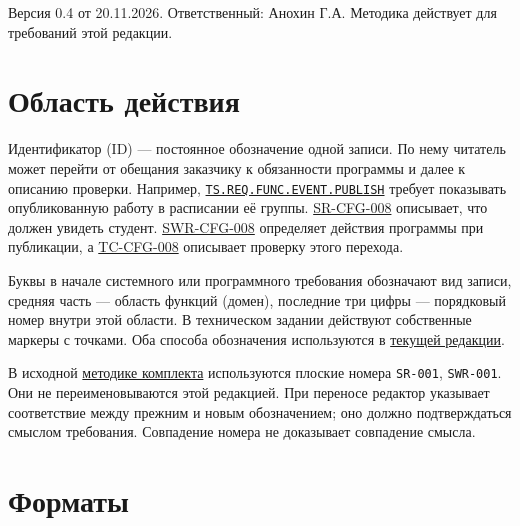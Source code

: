 \documentclass[12pt,a4paper]{article}
\begin{document}
Версия 0.4 от 20.11.2026. Ответственный: Анохин Г.А. Методика действует для требований этой редакции.

\section{Область действия}\label{ux43eux431ux43bux430ux441ux442ux44c-ux434ux435ux439ux441ux442ux432ux438ux44f}

\hypertarget{область-действия}{}

Идентификатор (ID) --- постоянное обозначение одной записи. По нему читатель может перейти от обещания заказчику к обязанности программы и далее к описанию проверки. Например, {\href{../02\_Техническое\_задание/DOC-02\_Техническое\_задание.pdf\#ts-req-func-event-publish}{\texttt{TS.\allowbreak{}REQ.\allowbreak{}FUNC.\allowbreak{}EVENT.\allowbreak{}PUBLISH}}} требует показывать опубликованную работу в расписании её группы. {\href{../04\_Системные\_требования/DOC-05\_Системные\_требования.pdf\#sr-cfg-008}{SR-CFG-008}} описывает, что должен увидеть студент. {\href{../07\_Программные\_требования/DOC-06\_Программные\_требования.pdf\#swr-cfg-008}{SWR-CFG-008}} определяет действия программы при публикации, а {\href{../10\_Верификация\_и\_тестирование/DOC-10\_План\_верификации.pdf\#tc-cfg-008}{TC-CFG-008}} описывает проверку этого перехода.

Буквы в начале системного или программного требования обозначают вид записи, средняя часть --- область функций (домен), последние три цифры --- порядковый номер внутри этой области. В техническом задании действуют собственные маркеры с точками. Оба способа обозначения используются в \href{https://github.com/Kokorev-VD/mephi-samolety/blob/main/docs/README.md}{текущей редакции}.

В исходной \href{https://github.com/Kokorev-VD/mephi-samolety/blob/main/notes/methodology/id-methodology.md}{методике комплекта} используются плоские номера \texttt{SR-001}, \texttt{SWR-001}. Они не переименовываются этой редакцией. При переносе редактор указывает соответствие между прежним и новым обозначением; оно должно подтверждаться смыслом требования. Совпадение номера не доказывает совпадение смысла.

\section{Форматы}\label{ux444ux43eux440ux43cux430ux442ux44b}

\hypertarget{форматы}{}
\end{document}
